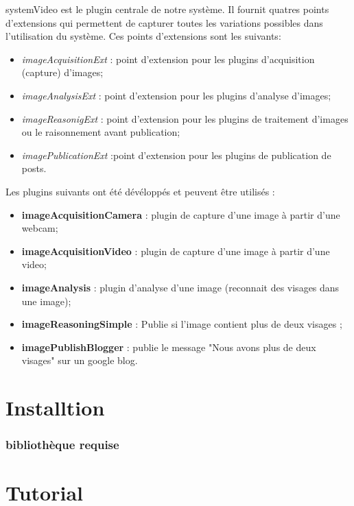 \documentclass[a4paper , 12pt]{article}
\begin{document}
systemVideo est le plugin centrale de notre système. Il fournit quatres points d'extensions qui permettent de capturer toutes les variations possibles dans l'utilisation du système. Ces points d'extensions sont les suivants:
 
\begin{itemize}
\item {\it imageAcquisitionExt} : point d'extension pour les plugins d'acquisition (capture) d'images; 
\item {\it imageAnalysisExt} : point d'extension pour les plugins d'analyse d'images;
\item {\it imageReasonigExt} : point d'extension pour les plugins de traitement d'images ou le raisonnement avant publication; 
\item {\it imagePublicationExt} :point d'extension pour les plugins de publication de posts.
\end{itemize}  
Les plugins suivants ont été dévéloppés et peuvent être utilisés : 
\begin{itemize}
\item {\bf imageAcquisitionCamera} : plugin de capture d'une image à partir d'une webcam; 
\item {\bf imageAcquisitionVideo} :  plugin de capture d'une image à partir d'une video;
\item {\bf imageAnalysis} : plugin d'analyse d'une image (reconnait des visages dans une image); 
\item {\bf imageReasoningSimple} : Publie si l'image contient plus de deux visages ;
\item {\bf imagePublishBlogger} :  publie le message "Nous avons plus de deux visages" sur un google blog.
\end{itemize}  


\part*{Installtion}
\section{bibliothèque requise}

\part*{Tutorial}
\end{document}
